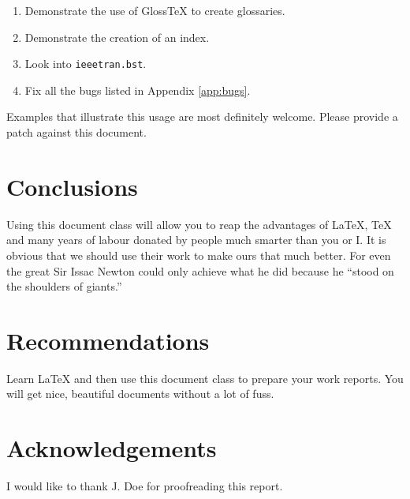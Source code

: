 \documentclass{uw-wkrpt}
\begin{document}
\begin{enumerate}
  \item Demonstrate the use of Gloss\TeX{} to create glossaries.
  \item Demonstrate the creation of an index.
  \item Look into \texttt{ieeetran.bst}.
  \item Fix all the bugs listed in Appendix \ref{app:bugs}.
\end{enumerate}

Examples that illustrate this usage are most definitely welcome.  Please
provide a patch against this document.

\section{Conclusions}
Using this document class will allow you to reap the advantages of
\LaTeX{}, \TeX{} and many years of labour donated by people much 
smarter than you or I.  It is obvious that we should use their work
to make ours that much better.  For even the great Sir Issac Newton
could only achieve what he did because he ``stood on the shoulders
of giants.''

\section{Recommendations}
Learn \LaTeX{} and then use this document class to prepare your
work reports.  You will get nice, beautiful documents without a lot
of fuss.

\clearpage


\printbibliography[heading=bibintoc]

\section*{Acknowledgements}
{}
I would like to thank J. Doe for proofreading this report.
\end{document}
